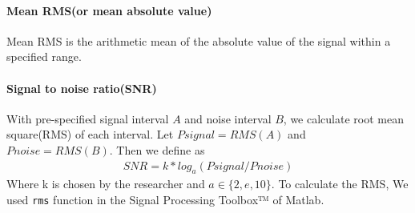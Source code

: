 \documentclass[a4papaer, 11pt]{article}
\begin{document}
\paragraph{Mean RMS(or mean absolute value)}Mean RMS is the arithmetic mean of the absolute value of the signal within a specified range.

\paragraph{Signal to noise ratio(SNR)}
With pre-specified signal interval $A$ and noise interval $B$,
we calculate root mean square(RMS) of each interval.
Let $Psignal = RMS(A)$ and $Pnoise = RMS(B)$. Then we define as
\begin{align*}
	SNR = k * log_a(Psignal / Pnoise)
\end{align*}
Where k is chosen by the researcher and $a \in \{2, e, 10\}$.
To calculate the RMS, We used \texttt{rms} function in the Signal Processing Toolbox™ of Matlab.
\end{document}
